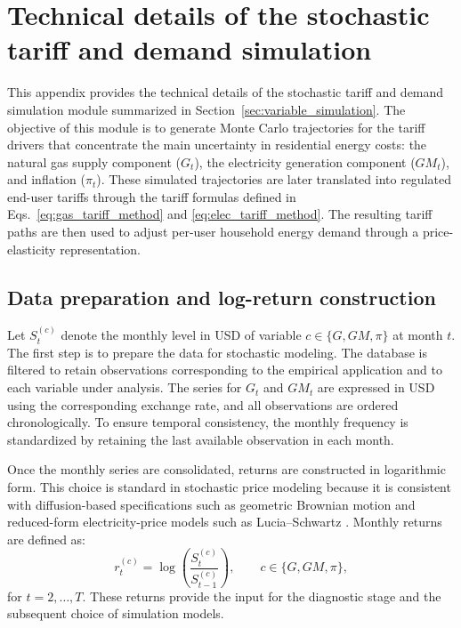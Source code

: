 \documentclass[authoryear,preprint,review,10pt]{elsarticle}
\begin{document}
\appendix
{}
\section{Technical details of the stochastic tariff and demand simulation}
\label{appendix:stochastic_simulation}

This appendix provides the technical details of the stochastic tariff and demand simulation module summarized in Section~\ref{sec:variable_simulation}. The objective of this module is to generate Monte Carlo trajectories for the tariff drivers that concentrate the main uncertainty in residential energy costs: the natural gas supply component ($G_t$), the electricity generation component ($GM_t$), and inflation ($\pi_t$). These simulated trajectories are later translated into regulated end-user tariffs through the tariff formulas defined in Eqs.~\eqref{eq:gas_tariff_method} and \eqref{eq:elec_tariff_method}. The resulting tariff paths are then used to adjust per-user household energy demand through a price-elasticity representation.

\subsection{Data preparation and log-return construction}
\label{appendix:prep}

Let $S_t^{(c)}$ denote the monthly level in USD of variable $c \in \{G,GM,\pi\}$ at month $t$. The first step is to prepare the data for stochastic modeling. The database is filtered to retain observations corresponding to the empirical application and to each variable under analysis. The series for $G_t$ and $GM_t$ are expressed in USD using the corresponding exchange rate, and all observations are ordered chronologically. To ensure temporal consistency, the monthly frequency is standardized by retaining the last available observation in each month.

Once the monthly series are consolidated, returns are constructed in logarithmic form. This choice is standard in stochastic price modeling because it is consistent with diffusion-based specifications such as geometric Brownian motion \citep{ibrahim2021geometric} and reduced-form electricity-price models such as Lucia--Schwartz \citep{lucia2002electricity}. Monthly returns are defined as:
\begin{equation}
    r_t^{(c)} = \log\!\left(\frac{S_t^{(c)}}{S_{t-1}^{(c)}}\right),
    \qquad c \in \{G,GM,\pi\},
\end{equation}
for $t = 2,\dots,T$. These returns provide the input for the diagnostic stage and the subsequent choice of simulation models.
\end{document}
